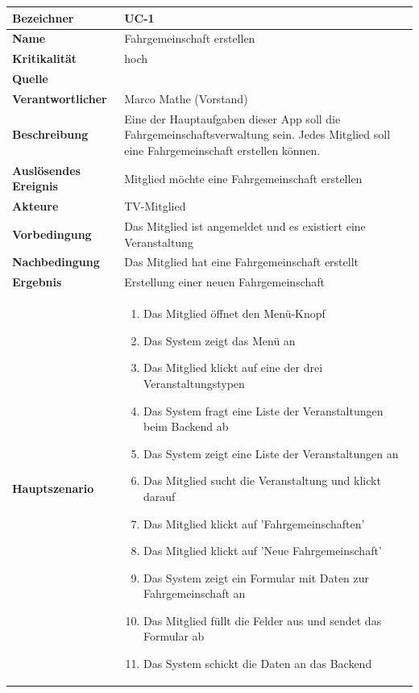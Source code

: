 \begin{table}[ht]
\centering
  \begin{tabular}{ l | p{10cm} }
	\hline
	\rowcolor{gray}
	\textbf{Bezeichner}		&	\textbf{UC-1}\\ \hline
	\textbf{Name}			&	Fahrgemeinschaft erstellen\\ \hline
	\textbf{Kritikalität}		&	hoch\\ \hline
	\textbf{Quelle}			&	\glossarmark{Stakeholder}\\ \hline
	\textbf{Verantwortlicher}	&	Marco Mathe (Vorstand)\\ \hline
	\textbf{Beschreibung}	&	Eine der Hauptaufgaben dieser App soll die Fahrgemeinschaftsverwaltung sein. Jedes Mitglied soll eine Fahrgemeinschaft erstellen können.\\ \hline
	\textbf{Auslösendes Ereignis}&	Mitglied möchte eine Fahrgemeinschaft erstellen\\ \hline
	\textbf{Akteure}		&	TV-Mitglied\\ \hline
	\textbf{Vorbedingung}	&	Das Mitglied ist angemeldet und es existiert eine Veranstaltung\\ \hline
	\textbf{Nachbedingung}	&	Das Mitglied hat eine Fahrgemeinschaft erstellt\\ \hline
	\textbf{Ergebnis}		&	Erstellung einer neuen Fahrgemeinschaft\\ \hline
	\textbf{Hauptszenario}	&	\begin{enumerate}
					\item Das Mitglied öffnet den Menü-Knopf
					\item Das System zeigt das Menü an
					\item Das Mitglied klickt auf eine der drei Veranstaltungstypen
					\item Das System fragt eine Liste der Veranstaltungen beim Backend ab
					\item Das System zeigt eine Liste der Veranstaltungen an
					\item Das Mitglied sucht die Veranstaltung und klickt darauf
					\item Das Mitglied klickt auf 'Fahrgemeinschaften'
					\item Das Mitglied klickt auf 'Neue Fahrgemeinschaft'
					\item Das System zeigt ein Formular mit Daten zur Fahrgemeinschaft an
					\item Das Mitglied füllt die Felder aus und sendet das Formular ab
					\item Das System schickt die Daten an das Backend

\end{enumerate}
\end{tabular}
\end{table}
